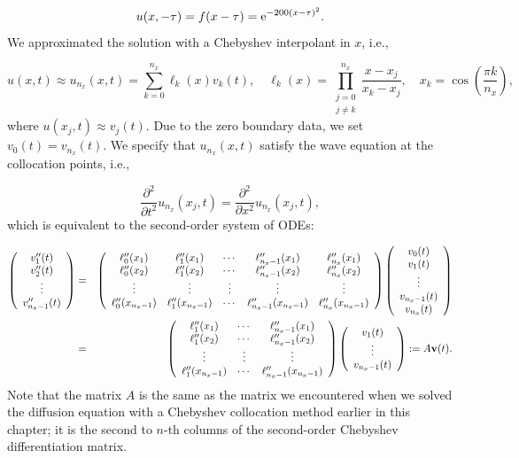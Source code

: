 \documentclass[12pt,a4paper]{article}
\begin{document}
\[
u(x,-\tau) = f(x - \tau) = {\rm e}^{-200(x-\tau)^2}.
\]
We approximated the solution with a Chebyshev interpolant in $x$, i.e., 

\[
u(x,t) \approx u_{n_x}(x,t) = \sum_{k=0}^{n_x} \ell_k(x)v_k(t), \quad \ell_k(x) = \prod_{\substack{j=0\\ j \neq k}}^{n_x}\frac{x-x_j}{x_k-x_j}, \quad x_k = \cos\left(\frac{\pi k}{n_x} \right),
\]
where $u(x_j,t) \approx v_j(t)$.  Due to the zero boundary data, we set $v_0(t) = v_{n_x}(t)$. We specify that $u_{n_x}(x,t)$ satisfy the wave equation at the collocation points, i.e., 

\[
\frac{\partial^2}{\partial t^2}u_{n_x}(x_j,t) = \frac{\partial^2}{\partial x^2} u_{n_x}(x_j,t),
\]
which is equivalent to the second-order system of ODEs:


\begin{eqnarray*}
\left(
\begin{array}{c}
v_1''(t) \\
v_2''(t) \\
\vdots \\
v_{n_x-1}''(t)
\end{array}
\right) &=& 
\left(
\begin{array}{c c c c c}
\ell''_0(x_1) &\ell''_1(x_1) & \cdots &\ell''_{n_x-1}(x_1) & \ell''_{n_x}(x_1) \\
\ell''_0(x_2) &\ell''_1(x_2) & \cdots &\ell''_{n_x-1}(x_2) & \ell''_{n_x}(x_2)  \\
     \vdots  & \vdots & \vdots & \vdots & \vdots  \\
\ell''_0(x_{n_x-1}) &\ell''_1(x_{n_x-1}) & \cdots &\ell''_{n_x-1}(x_{n_x-1}) & \ell''_{n_x}(x_{n_x-1})
\end{array} 
\right)
\left(
\begin{array}{c}
v_0(t) \\
v_1(t) \\
\vdots \\
v_{n_x-1}(t) \\
v_{n_x}(t)
\end{array}
\right) \\
&=& \left(
\begin{array}{ c c c }
\ell''_1(x_1) & \cdots &\ell''_{n_x-1}(x_1)  \\
\ell''_1(x_2) & \cdots &\ell''_{n_x-1}(x_2)   \\
   \vdots & \vdots & \vdots   \\
\ell''_1(x_{n_x-1}) & \cdots &\ell''_{n_x-1}(x_{n_x-1}) 
\end{array} 
\right)
\left(
\begin{array}{c}
v_1(t) \\
\vdots \\
v_{n_x-1}(t)
\end{array}
\right)  := A\mathbf{v}(t).
\end{eqnarray*}
Note that the matrix $A$ is the same as the matrix we encountered when we solved the diffusion equation with a Chebyshev collocation method earlier in this chapter; it is the second to $n$-th columns of the second-order Chebyshev differentiation matrix.
\end{document}
